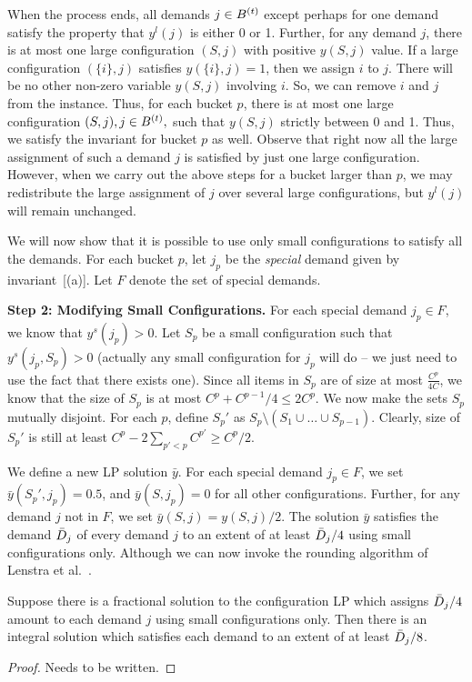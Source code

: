 When the process ends, all demands $j \in B^{(t)}$  except perhaps for one demand satisfy the property that $y^l(j)$ is either 0 or 1. Further, for any demand $j$, there is at most one large configuration $(S,j)$ with positive $y(S,j)$ value. If a large configuration $(\{i\},j)$ satisfies $y(\{i\},j)=1$, then we assign $i$ to $j$. There will be no other non-zero variable  $y(S,j)$ involving $i$. So, we can remove $i$ and $j$ from the instance. Thus, for each bucket $p$, there is at most one large configuration $(S,j), j \in B^{(t)},$  such that $y(S,j)$ strictly between 0 and 1.  Thus, we  satisfy the invariant for bucket $p$ as well. Observe that right now all the large assignment of such a demand $j$ is satisfied by just one large configuration. However, when we carry out the
above steps for a bucket larger than $p$, we may redistribute the large assignment of $j$ over several large configurations, but $y^l(j)$ will remain unchanged.


We will now show that it is possible to use only small configurations to satisfy all the demands.
For each bucket $p$, let $j_p$ be the {\em special} demand given by invariant~[(a)]. Let $F$ denote the set of special demands.

\medskip \noindent
{\bf Step 2: Modifying Small Configurations.} For each special demand $j_p \in F$, we know that $y^s(j_p) > 0$. Let $S_p$ be a small configuration such that $y^s(j_p, S_p) > 0$ (actually any small configuration for $j_p$ will do -- we just need to use the fact that there exists one).
 Since all items in $S_p$ are of size at most $\frac{C^p}{4C}$, we know that the size of $S_p$ is at most $C^p + C^{p-1}/4 \leq 2C^p$. We now make the sets $S_p$ mutually disjoint. For each $p$, define $S_p'$ as $S_p \setminus (S_1 \cup \ldots \cup S_{p-1})$. Clearly, size of $S_p'$ is still at least $C^p - 2\sum_{p' < p} C^{p'} \geq C^p/2. $

We define a new LP solution ${\bar y}$.
For each special demand $j_p \in F$,
we set ${\bar y}(S_p',j_p) = 0.5$, and ${\bar y}(S,j_p) = 0$ for all other configurations. Further, for any demand $j$ not in $F$, we set ${\bar y}(S,j) =  y(S,j)/2$. The solution ${\bar y}$ satisfies the demand ${\bar D}_j$ of every demand $j$ to an extent of at least ${\bar D}_j/4$ using small configurations only.  Although we can now invoke the rounding algorithm of Lenstra et al.~\cite{}.

\begin{lemma}
\label{lem:lst}
Suppose there is a fractional solution to the configuration LP which assigns ${\bar D}_j/4$ amount to each demand $j$ using small configurations only.
Then there is an integral solution which satisfies each demand to an extent of at least ${\bar D}_j/8$.
\end{lemma}
\begin{proof}
Needs to be written.
\end{proof}

